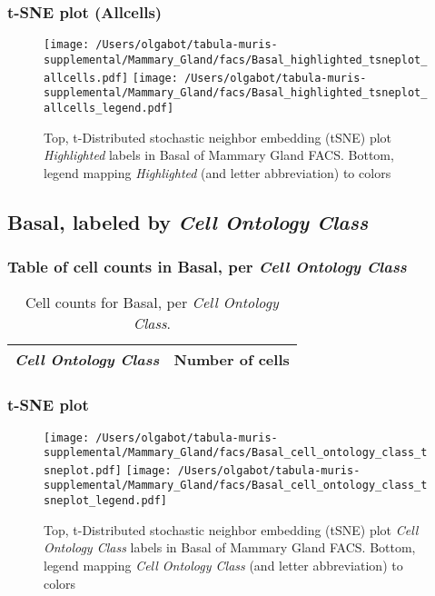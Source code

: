 \subsubsection{t-SNE plot (Allcells)}
\begin{figure}[h]
\centering
\texttt{[image: /Users/olgabot/tabula-muris-supplemental/Mammary\_Gland/facs/Basal\_highlighted\_tsneplot\_allcells.pdf]}
\texttt{[image: /Users/olgabot/tabula-muris-supplemental/Mammary\_Gland/facs/Basal\_highlighted\_tsneplot\_allcells\_legend.pdf]}
\caption{Top, t-Distributed stochastic neighbor embedding (tSNE) plot  \emph{Highlighted} labels in Basal of Mammary Gland FACS. Bottom, legend mapping \emph{Highlighted} (and letter abbreviation) to colors}
\end{figure}


\clearpage

\subsection{Basal, labeled by \emph{Cell Ontology Class}}
\subsubsection{Table of cell counts in Basal, per \emph{Cell Ontology Class}}\begin{table}[h]
\centering
\label{my-label}
\begin{tabular}{@{}ll@{}}
\toprule

\emph{Cell Ontology Class}& Number of cells \\ \midrule\bottomrule
\end{tabular}
\caption{Cell counts for Basal, per \emph{Cell Ontology Class}.}
\end{table}

\clearpage
\subsubsection{t-SNE plot}
\begin{figure}[h]
\centering
\texttt{[image: /Users/olgabot/tabula-muris-supplemental/Mammary\_Gland/facs/Basal\_cell\_ontology\_class\_tsneplot.pdf]}
\texttt{[image: /Users/olgabot/tabula-muris-supplemental/Mammary\_Gland/facs/Basal\_cell\_ontology\_class\_tsneplot\_legend.pdf]}
\caption{Top, t-Distributed stochastic neighbor embedding (tSNE) plot  \emph{Cell Ontology Class} labels in Basal of Mammary Gland FACS. Bottom, legend mapping \emph{Cell Ontology Class} (and letter abbreviation) to colors}
\end{figure}


